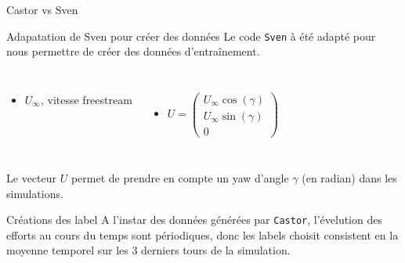 \documentclass[
11pt,notheorems,hyperref={pdfauthor=whatever}
]{beamer}
\begin{document}
\begin{frame}{Castor vs Sven}
    
\end{frame}

\begin{frame}{Adapatation de Sven pour créer des données}
    Le code \texttt{Sven} à été adapté pour nous permettre de créer des données d'entraînement. 


    \begin{columns}[c]
        \begin{itemize}\small
            \item $U_{\infty}$, vitesse freestream
        \end{itemize}

        
        \centering 

        \begin{itemize}\small
            \item $U = \begin{pmatrix}
                U_{\infty}\cos(\gamma)\\
                U_{\infty}\sin(\gamma)\\
                0
            \end{pmatrix}$
        \end{itemize}
    \end{columns}    
    
    \vspace{0.2cm}

    Le vecteur $U$ permet de prendre en compte un yaw d'angle $\gamma$ (en radian) dans les simulations.
\end{frame}

\begin{frame}{Créations des label}
    A l'instar des données générées par \texttt{Castor}, l'évelution des efforts au cours du temps sont périodiques, donc les labels choisit consistent en 
    la moyenne temporel sur les 3 derniers tours de la simulation.  
\end{frame}
\end{document}

